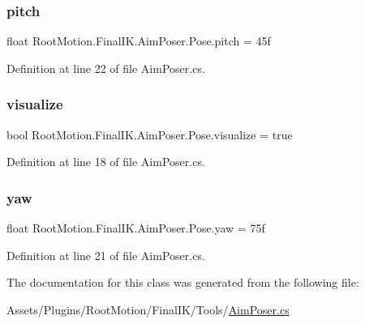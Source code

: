 \subsubsection{\texorpdfstring{pitch}{pitch}}
{\footnotesize\ttfamily float Root\+Motion.\+Final\+I\+K.\+Aim\+Poser.\+Pose.\+pitch = 45f}



Definition at line 22 of file Aim\+Poser.\+cs.

\mbox{\label{class_root_motion_1_1_final_i_k_1_1_aim_poser_1_1_pose_a86c56969435180d948fd9a083df0d71d}} 
\subsubsection{\texorpdfstring{visualize}{visualize}}
{\footnotesize\ttfamily bool Root\+Motion.\+Final\+I\+K.\+Aim\+Poser.\+Pose.\+visualize = true}



Definition at line 18 of file Aim\+Poser.\+cs.

\mbox{\label{class_root_motion_1_1_final_i_k_1_1_aim_poser_1_1_pose_a2b70f8152c3a97c606d321571319ec2b}} 
\subsubsection{\texorpdfstring{yaw}{yaw}}
{\footnotesize\ttfamily float Root\+Motion.\+Final\+I\+K.\+Aim\+Poser.\+Pose.\+yaw = 75f}



Definition at line 21 of file Aim\+Poser.\+cs.



The documentation for this class was generated from the following file\+:\begin{DoxyCompactItemize}
\item 
Assets/\+Plugins/\+Root\+Motion/\+Final\+I\+K/\+Tools/\mbox{\hyperlink{_aim_poser_8cs}{Aim\+Poser.\+cs}}\end{DoxyCompactItemize}
